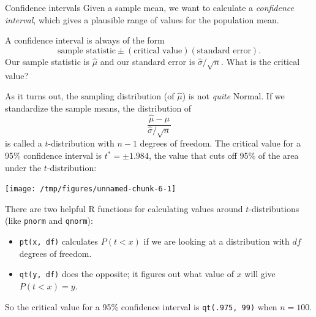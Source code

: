 \documentclass{beamer}\usepackage[]{graphicx}\usepackage[]{color}
\newenvironment{knitrout}{}{} %
\begin{document}
\begin{darkframes}
      
    \begin{frame}{Confidence intervals}
      Given a sample mean, we want to calculate a \emph{confidence interval}, which gives a plausible range of values for the population mean.
      \pause\vspace{2em}
      
      A confidence interval is always of the form
      \[
        \text{sample statistic} \pm (\text{critical value})(\text{standard error}).
      \]
      \pause
      Our sample statistic is $\hat\mu$ and our standard error is $\hat\sigma/\sqrt n$.
      \pause
      What is the critical value?
    \end{frame}
      
      
    \begin{frame}
      As it turns out, the sampling distribution (of $\hat\mu$) is not \emph{quite} Normal. If we standardize the sample means, the distribution of \[ \frac{\hat\mu - \mu}{ \hat\sigma/\sqrt n } \] is called a $t$-distribution with $n-1$ degrees of freedom. \pause The critical value for a 95\% confidence interval is $t^*=\pm1.984$, the value that cuts off 95\% of the area under the $t$-distribution:
      
\begin{knitrout}
\color{fgcolor}
\texttt{[image: /tmp/figures/unnamed-chunk-6-1]} 

\end{knitrout}
    \end{frame}
      
      
    \begin{frame}[fragile]
      There are two helpful R functions for calculating values around $t$-distributions (like \verb|pnorm| and \verb|qnorm|):
      \begin{itemize}[<+->]
        \item \verb|pt(x, df)| calculates $P(t<x)$ if we are looking at a distribution with $df$ degrees of freedom. \pause
        \item \verb|qt(y, df)| does the opposite; it figures out what value of $x$ will give $P(t<x)=y$. \pause
      \end{itemize}
      So the critical value for a 95\% confidence interval is \verb|qt(.975, 99)| when $n=100$. \pause\bigskip      
    \end{frame}
      

\end{darkframes}
\end{document}
